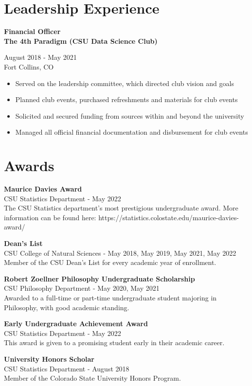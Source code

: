 \documentclass{article}
\newcommand{\resumeSubheading}[5]{
\noindent\begin{minipage}{0.5\textwidth}
	\begin{flushleft}
	\textbf{#1}\\
	\textbf{#2}\\
	\end{flushleft}
\end{minipage}%
\hfill
\begin{minipage}{0.5\textwidth}
	\begin{flushright}
	#3\\
	#4\\
	\end{flushright}
\end{minipage}%
\newline
#5
}
\newcommand{\award}[4]{
\begin{flushleft}
\textbf{#1}\\
#2 - #3\\
#4\\
\end{flushleft}
\leavevmode
}
\begin{document}
\section{Leadership Experience} %
\resumeSubheading{Financial Officer}{The 4th Paradigm (CSU Data Science Club)}{August 2018 - May 2021}{Fort Collins, CO}{ %
\begin{itemize} %
	\item Served on the leadership committee, which directed club vision and goals %
	\item Planned club events, purchased refreshments and materials for club events %
	\item Solicited and secured funding from sources within and beyond the university %
	\item Managed all official financial documentation and disbursement for club events %
\end{itemize} %
} %



\section{Awards}  %
\award{Maurice Davies Award}{CSU Statistics Department}{May 2022}{ %
	The CSU Statistics department's most prestigious undergraduate award. More information can be found here: https://statistics.colostate.edu/maurice-davies-award/ %
} %
\award{Dean's List}{CSU College of Natural Sciences}{May 2018, May 2019, May 2021, May 2022}{ %
	Member of the CSU Dean's List for every academic year of enrollment. %
} %
\award{Robert Zoellner Philosophy Undergraduate Scholarship}{CSU Philosophy Department}{May 2020, May 2021}{ %
	Awarded to a full-time or part-time undergraduate student majoring in Philosophy, with good academic standing. %
} %
\award{Early Undergraduate Achievement Award}{CSU Statistics Department}{May 2022}{ %
	This award is given to a promising student early in their academic career. %
} %
\award{University Honors Scholar}{CSU Statistics Department}{August 2018}{ %
	Member of the Colorado State University Honors Program. %
} %
\end{document}
